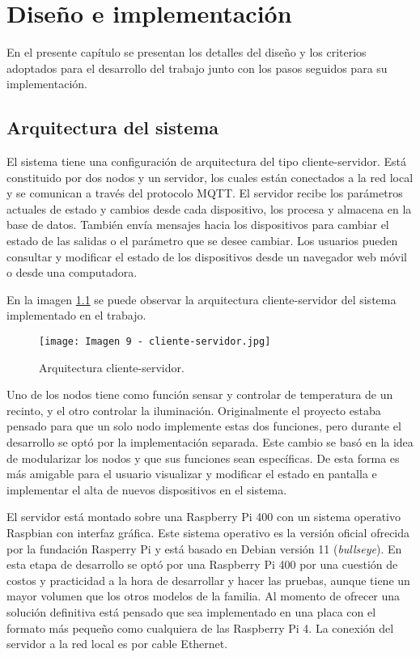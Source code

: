 \chapter{Diseño e implementación}

\label{Chapter3}

En el presente capítulo se presentan los detalles del diseño y los criterios adoptados para el desarrollo del trabajo junto con los pasos seguidos para su implementación.

\section{Arquitectura del sistema}

El sistema tiene una configuración de arquitectura del tipo cliente-servidor. Está constituido por dos nodos y un servidor, los cuales están conectados a la red local y se comunican a través del protocolo MQTT. El servidor recibe los parámetros actuales de estado y cambios desde cada dispositivo, los procesa y almacena en la base de datos. También envía mensajes hacia los dispositivos para cambiar el estado de las salidas o el parámetro que se desee cambiar. Los usuarios pueden consultar y modificar el estado de los dispositivos desde un navegador web móvil o desde una computadora.

En la imagen \ref{fig:9} se puede observar la arquitectura cliente-servidor del sistema implementado en el trabajo.

\begin{figure}[h]
\centering
\texttt{[image: Imagen 9 - cliente-servidor.jpg]}
\caption[Arquitectura cliente-servidor]{Arquitectura cliente-servidor. \footnotemark}
\label{fig:9}
\end{figure}

Uno de los nodos tiene como función sensar y controlar de temperatura de un recinto, y el otro controlar la iluminación. Originalmente el proyecto estaba pensado para que un solo nodo implemente estas dos funciones, pero durante el desarrollo se optó por la implementación separada. Este cambio se basó en la idea de modularizar los nodos y que sus funciones sean específicas. De esta forma es más amigable para el usuario visualizar y modificar el estado en pantalla e implementar el alta de nuevos dispositivos en el sistema.

El servidor está montado sobre una Raspberry Pi 400 con un sistema operativo Raspbian con interfaz gráfica. Este sistema operativo es la versión oficial ofrecida por la fundación Rasperry Pi y está basado en Debian versión 11 (\textit{bullseye}). En esta etapa de desarrollo se optó por una Raspberry Pi 400 por una cuestión de costos y practicidad a la hora de desarrollar y hacer las pruebas, aunque tiene un mayor volumen que los otros modelos de la familia. Al momento de ofrecer una solución definitiva está pensado que sea implementado en una placa con el formato más pequeño como cualquiera de las Raspberry Pi 4. La conexión del servidor a la red local es por cable Ethernet.

